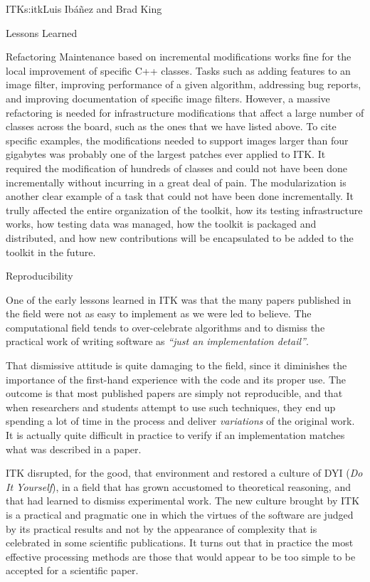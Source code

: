 \begin{aosachapter}{ITK}{s:itk}{Luis Ib\'{a}\~{n}ez and Brad King}
\begin{aosasect1}{Lessons Learned}
\begin{aosasect2}{Refactoring}
Maintenance based on incremental modifications works fine for the
local improvement of specific C++ classes. Tasks such as adding
features to an image filter, improving performance of a given
algorithm, addressing bug reports, and improving documentation of
specific image filters. However, a massive refactoring is needed for
infrastructure modifications that affect a large number of classes
across the board, such as the ones that we have listed above. To cite
specific examples, the modifications needed to support images larger
than four gigabytes was probably one of the largest patches ever applied to ITK.
It required the modification of hundreds of classes and could not have
been done incrementally without incurring in a great deal of pain. The
modularization is another clear example of a task that could not have
been done incrementally. It trully affected the entire organization of
the toolkit, how its testing infrastructure works, how testing data
was managed, how the toolkit is packaged and distributed, and how new
contributions will be encapsulated to be added to the toolkit in the
future.

\end{aosasect2}

\begin{aosasect2}{Reproducibility}

One of the early lessons learned in ITK was that the many papers published in
the field were not as easy to implement as we were led to believe.  The
computational field tends to over-celebrate algorithms and to dismiss the
practical work of writing software as \emph{``just an implementation detail''}.

That dismissive attitude is quite damaging to the field, since it diminishes the
importance of the first-hand experience with the code and its proper use. The
outcome is that most published papers are simply not reproducible, and that
when researchers and students attempt to use such techniques, they end up
spending a lot of time in the process and deliver \emph{variations} of the
original work. It is actually quite difficult in practice to verify if an
implementation matches what was described in a paper.

ITK disrupted, for the good, that environment and restored a culture of DYI
(\emph{Do It Yourself}), in a field that has grown accustomed to theoretical
reasoning, and that had learned to dismiss experimental work. The new culture
brought by ITK is a practical and pragmatic one in which the virtues of the
software are judged by its practical results and not by the appearance of
complexity that is celebrated in some scientific publications. It turns
out that in practice the most effective processing methods are those that
would appear to be too simple to be accepted for a scientific paper.


\end{aosasect2}
\end{aosasect1}
\end{aosachapter}
